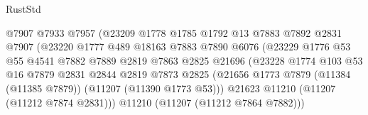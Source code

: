 \begin{lexlean}{RustStd}
\begin{coremodule}
                                      @7907
                                      @7933
                                      @7957
                                      (@23209
                                        @1778
                                        @1785
                                        @1792
                                        @13
                                        @7883
                                        @7892
                                        @2831
                                        @7907
                                        (@23220
                                          @1777
                                          @489
                                          @18163
                                          @7883
                                          @7890
                                          @6076
                                          (@23229
                                            @1776
                                            @53
                                            @55
                                            @4541
                                            @7882
                                            @7889
                                            @2819
                                            @7863
                                            @2825
                                            @21696
                                            (@23228
                                              @1774
                                              @103
                                              @53
                                              @16
                                              @7879
                                              @2831
                                              @2844
                                              @2819
                                              @7873
                                              @2825
                                              (@21656
                                                @1773
                                                @7879
                                                (@11384 (@11385 @7879))
                                                (@11207 (@11390 @1773 @53)))
                                              @21623
                                              @11210
                                              (@11207 (@11212 @7874 @2831)))
                                            @11210
                                            (@11207 (@11212 @7864 @7882)))

\end{coremodule}
\end{lexlean}
